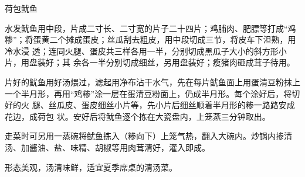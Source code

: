 %
%
%
%
%
%
%
\begin{recipe}{荷包鱿鱼}

\ingredients


\preparation

\step 水发鱿鱼用中段，片成二寸长、二寸宽的片子二十四片；鸡脯肉、肥膘等打成“鸡
糁”；将蛋黄二个摊成蛋皮；丝瓜刮去粗皮，用中段切成三节，将皮车下泹熟，用冷水浸
透；连同火腿、蛋皮共三样各用一半，分别切成黑瓜子大小的斜方形小片，用盘装好；其
余各一半分别切成细丝，另用盘装好；瘦猪肉砸成茸子待用。

\step 片好的鱿鱼用好汤煨过，滤起用净布沾干水气，先在每片鱿鱼面上用蛋清豆粉抹上
一个半月形，再用“鸡糁”涂一层在蛋清豆粉面上，仍成半月形。每个涂好后，将切好的火
腿、丝瓜皮、蛋皮细丝小片等，先小片后细丝顺着半月形的糁一路路安成花边，成荷包
状。安好后将鱿鱼逐个拣在大瓷盘内，上笼蒸三分钟取出。

\step 走菜时可另用一蒸碗将鱿鱼拣入（糁向下）上笼气热，翻入大碗内。炒锅内掺清
汤、加酱油、盐、味精、胡椒等用肉茸清好，灌入即成。

\features

形态美观，汤清味鲜，适宜夏季席桌的清汤菜。

\end{recipe}

